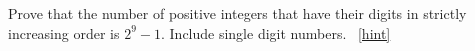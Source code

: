 \documentclass{book}
\begin{document}
\setcounter{project}{97}
\addtocounter{project}{-1}
\begin{activity}[]\label{activity-90}
\hypertarget{p-729}{}%
Prove that the number of positive integers that have their digits in strictly increasing order is \(2^{9} - 1\). Include single digit numbers.%
~\hfill{\tiny\hyperlink{a-97}{[hint]}\hypertarget{q-97}{}}\end{activity}
\end{document}

